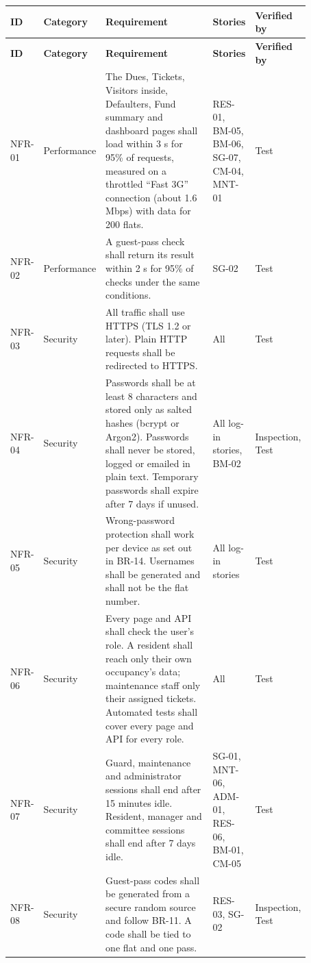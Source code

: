 \documentclass[11pt,a4paper]{report}
\begin{document}
{\small\setlength{\LTpre}{6pt}\setlength{\LTpost}{6pt}
\begin{longtable}{>{\raggedright\arraybackslash}p{0.068\linewidth}>{\raggedright\arraybackslash}p{0.154\linewidth}>{\raggedright\arraybackslash}p{0.410\linewidth}>{\raggedright\arraybackslash}p{0.126\linewidth}>{\raggedright\arraybackslash}p{0.116\linewidth}}
\toprule
\textbf{ID} & \textbf{Category} & \textbf{Requirement} & \textbf{Stories} & \textbf{Verified by} \\
\midrule
\endfirsthead
\toprule
\textbf{ID} & \textbf{Category} & \textbf{Requirement} & \textbf{Stories} & \textbf{Verified by} \\
\midrule
\endhead
\bottomrule
\endlastfoot
NFR-01 & Performance & The Dues, Tickets, Visitors inside, Defaulters, Fund summary and dashboard pages shall load within 3 s for 95\% of requests, measured on a throttled ``Fast 3G'' connection (about 1.6 Mbps) with data for 200 flats. & RES-01, BM-05, BM-06, SG-07, CM-04, MNT-01 & Test \\
NFR-02 & Performance & A guest-pass check shall return its result within 2 s for 95\% of checks under the same conditions. & SG-02 & Test \\
NFR-03 & Security & All traffic shall use HTTPS (TLS 1.2 or later). Plain HTTP requests shall be redirected to HTTPS. & All & Test \\
NFR-04 & Security & Passwords shall be at least 8 characters and stored only as salted hashes (bcrypt or Argon2). Passwords shall never be stored, logged or emailed in plain text. Temporary passwords shall expire after 7 days if unused. & All log-in stories, BM-02 & Inspection, Test \\
NFR-05 & Security & Wrong-password protection shall work per device as set out in BR-14. Usernames shall be generated and shall not be the flat number. & All log-in stories & Test \\
NFR-06 & Security & Every page and API shall check the user's role. A resident shall reach only their own occupancy's data; maintenance staff only their assigned tickets. Automated tests shall cover every page and API for every role. & All & Test \\
NFR-07 & Security & Guard, maintenance and administrator sessions shall end after 15 minutes idle. Resident, manager and committee sessions shall end after 7 days idle. & SG-01, MNT-06, ADM-01, RES-06, BM-01, CM-05 & Test \\
NFR-08 & Security & Guest-pass codes shall be generated from a secure random source and follow BR-11. A code shall be tied to one flat and one pass. & RES-03, SG-02 & Inspection, Test \\

\end{longtable}}
\end{document}
